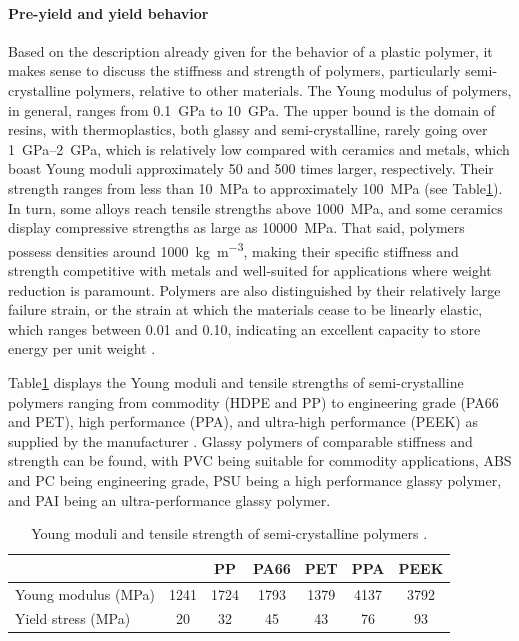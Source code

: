 \paragraph{Pre-yield and yield behavior}

Based on the description already given for the behavior of a plastic polymer, it makes sense to discuss the stiffness and strength of polymers, particularly semi-crystalline polymers, relative to other materials.
The Young modulus of polymers, in general, ranges from \SI{0.1}{\giga\pascal} to \SI{10}{\giga\pascal}.
The upper bound is the domain of resins, with thermoplastics, both glassy and semi-crystalline, rarely going over \SIrange{1}{2}{\giga\pascal}, which is relatively low compared with ceramics and metals, which boast Young moduli approximately 50 and 500 times larger, respectively.
Their strength ranges from less than \SI{10}{\mega\pascal} to approximately \SI{100}{\mega\pascal} (see Table\ref{tab:scp_mech_props}).
In turn, some alloys reach tensile strengths above \SI{1000}{\mega\pascal}, and some ceramics display compressive strengths as large as \SI{10000}{\mega\pascal}.
That said, polymers possess densities around \SI{1000}{\kilo\gram\per\meter^3}, making their specific stiffness and strength competitive with metals and well-suited for applications where weight reduction is paramount.
Polymers are also distinguished by their relatively large failure strain, or the strain at which the materials cease to be linearly elastic, which ranges between 0.01 and 0.10, indicating an excellent capacity to store energy per unit weight \citep{ashbyMaterialsSelectionMechanical1999}.

Table\ref{tab:scp_mech_props} displays the Young moduli and tensile strengths of semi-crystalline polymers ranging from commodity (HDPE and PP) to engineering grade (PA66 and PET), high performance (PPA), and ultra-high performance (PEEK) as supplied by the manufacturer \citep{rtpcompanyProductGuideRTP2021}.
Glassy polymers of comparable stiffness and strength can be found, with PVC being suitable for commodity applications, ABS and PC being engineering grade, PSU being a high performance glassy polymer, and PAI being an ultra-performance glassy polymer.
\begin{table}[hbpt]
    \centering
    \caption{Young moduli and tensile strength of semi-crystalline polymers \citep{rtpcompanyProductGuideRTP2021}.}
    \label{tab:scp_mech_props}
    \begin{tabular}{lcccccc}
        \hline\hline
        & \vphantom{\Big |}{HDPE} &{PP} &{PA66} &{PET} & {PPA}  &{PEEK} \\
        \hline
        \vphantom{\Big |}Young modulus (\si{\mega\pascal}) & 1241 & 1724 & 1793 & 1379 & 4137 & 3792  \\
        \vphantom{\Big |}Yield stress (\si{\mega\pascal}) & 20 & 32 & 45 & 43 & 76  & 93 \\
        \hline\hline
    \end{tabular}
\end{table}

